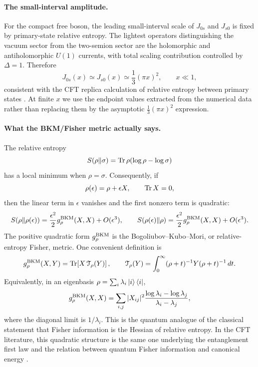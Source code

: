 \documentclass{article}
\theoremstyle{plain}
\theoremstyle{definition}
\theoremstyle{plain}
\begin{document}
\paragraph{The small-interval amplitude.}
For the compact free boson, the leading small-interval scale of $J_{0s}$ and $J_{s0}$ is fixed by
primary-state relative entropy.  The lightest operators distinguishing the vacuum sector from the
two-semion sector are the holomorphic and antiholomorphic $U(1)$ currents, with total scaling
contribution controlled by $\Delta=1$.  Therefore
\begin{equation}
    J_{0s}(x)\simeq J_{s0}(x)
    \simeq \frac{1}{3}(\pi x)^2,
    \qquad x\ll1,
\end{equation}
consistent with the CFT replica calculation of relative entropy between primary states
\cite{Lashkari2014,Lashkari2015}.  At finite $x$ we use the endpoint values extracted from the
numerical data rather than replacing them by the asymptotic $\frac13(\pi x)^2$ expression.

\paragraph{What the BKM/Fisher metric actually says.}
The relative entropy
\begin{equation}
    S(\rho\|\sigma)=\Tr\rho(\log\rho-\log\sigma)
\end{equation}
has a local minimum when $\rho=\sigma$.  Consequently, if
\begin{equation}
    \rho(\epsilon)=\rho+\epsilon X,
    \qquad \Tr X=0,
\end{equation}
then the linear term in $\epsilon$ vanishes and the first nonzero term is quadratic:
\begin{equation}
    S(\rho\|\rho(\epsilon))
    =\frac{\epsilon^2}{2}
    g_{\rho}^{\rm BKM}(X,X)+O(\epsilon^3),
    \qquad
    S(\rho(\epsilon)\|\rho)
    =\frac{\epsilon^2}{2}
    g_{\rho}^{\rm BKM}(X,X)+O(\epsilon^3).
\label{eq:bkm_quadratic_expansion}
\end{equation}
The positive quadratic form $g_{\rho}^{\rm BKM}$ is the Bogoliubov--Kubo--Mori, or
relative-entropy Fisher, metric.  One convenient definition is
\begin{equation}
    g_{\rho}^{\rm BKM}(X,Y)
    =\Tr\!\left[X\,\mathcal T_{\rho}(Y)\right],
    \qquad
    \mathcal T_{\rho}(Y)
    =\int_0^\infty (\rho+t)^{-1}Y(\rho+t)^{-1}\,dt .
\label{eq:bkm_metric_definition}
\end{equation}
Equivalently, in an eigenbasis $\rho=\sum_i\lambda_i\ket{i}\bra{i}$,
\begin{equation}
    g_{\rho}^{\rm BKM}(X,X)
    =\sum_{i,j}|X_{ij}|^2
    \frac{\log\lambda_i-\log\lambda_j}{\lambda_i-\lambda_j},
\end{equation}
where the diagonal limit is $1/\lambda_i$.  This is the quantum analogue of the classical
statement that Fisher information is the Hessian of relative entropy.  In the CFT literature,
this quadratic structure is the same one underlying the entanglement first law and the relation
between quantum Fisher information and canonical energy \cite{2013JHEP...08..060B,2016JHEP...04..153L}.
\end{document}
